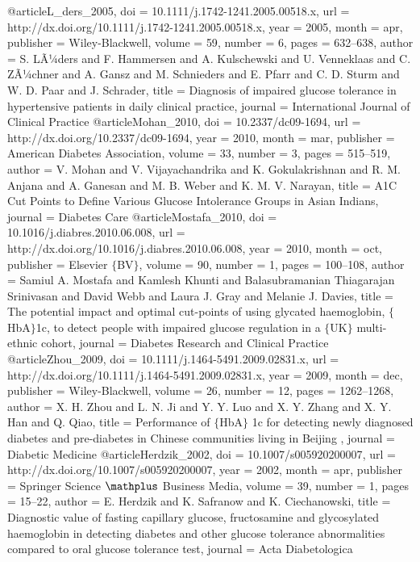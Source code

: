 @article{L_ders_2005,
	doi = {10.1111/j.1742-1241.2005.00518.x},
	url = {http://dx.doi.org/10.1111/j.1742-1241.2005.00518.x},
	year = 2005,
	month = {apr},
	publisher = {Wiley-Blackwell},
	volume = {59},
	number = {6},
	pages = {632--638},
	author = {S. LÃ¼ders and F. Hammersen and A. Kulschewski and U. Venneklaas and C. ZÃ¼chner and A. Gansz and M. Schnieders and E. Pfarr and C. D. Sturm and W. D. Paar and J. Schrader},
	title = {Diagnosis of impaired glucose tolerance in hypertensive patients in daily clinical practice},
	journal = {International Journal of Clinical Practice}
}
@article{Mohan_2010,
	doi = {10.2337/dc09-1694},
	url = {http://dx.doi.org/10.2337/dc09-1694},
	year = 2010,
	month = {mar},
	publisher = {American Diabetes Association},
	volume = {33},
	number = {3},
	pages = {515--519},
	author = {V. Mohan and V. Vijayachandrika and K. Gokulakrishnan and R. M. Anjana and A. Ganesan and M. B. Weber and K. M. V. Narayan},
	title = {A1C Cut Points to Define Various Glucose Intolerance Groups in Asian Indians},
	journal = {Diabetes Care}
}
@article{Mostafa_2010,
	doi = {10.1016/j.diabres.2010.06.008},
	url = {http://dx.doi.org/10.1016/j.diabres.2010.06.008},
	year = 2010,
	month = {oct},
	publisher = {Elsevier $\lbrace$BV$\rbrace$},
	volume = {90},
	number = {1},
	pages = {100--108},
	author = {Samiul A. Mostafa and Kamlesh Khunti and Balasubramanian Thiagarajan Srinivasan and David Webb and Laura J. Gray and Melanie J. Davies},
	title = {The potential impact and optimal cut-points of using glycated haemoglobin, $\lbrace$HbA$\rbrace$1c, to detect people with impaired glucose regulation in a $\lbrace$UK$\rbrace$ multi-ethnic cohort},
	journal = {Diabetes Research and Clinical Practice}
}
@article{Zhou_2009,
	doi = {10.1111/j.1464-5491.2009.02831.x},
	url = {http://dx.doi.org/10.1111/j.1464-5491.2009.02831.x},
	year = 2009,
	month = {dec},
	publisher = {Wiley-Blackwell},
	volume = {26},
	number = {12},
	pages = {1262--1268},
	author = {X. H. Zhou and L. N. Ji and Y. Y. Luo and X. Y. Zhang and X. Y. Han and Q. Qiao},
	title = { Performance of $\lbrace$HbA$\rbrace$ 1c for detecting newly diagnosed diabetes and pre-diabetes in Chinese communities living in Beijing },
	journal = {Diabetic Medicine}
}
@article{Herdzik_2002,
	doi = {10.1007/s005920200007},
	url = {http://dx.doi.org/10.1007/s005920200007},
	year = 2002,
	month = {apr},
	publisher = {Springer Science $\mathplus$ Business Media},
	volume = {39},
	number = {1},
	pages = {15--22},
	author = {E. Herdzik and K. Safranow and K. Ciechanowski},
	title = {Diagnostic value of fasting capillary glucose, fructosamine and glycosylated haemoglobin in detecting diabetes and other glucose tolerance abnormalities compared to oral glucose tolerance test},
	journal = {Acta Diabetologica}
}
